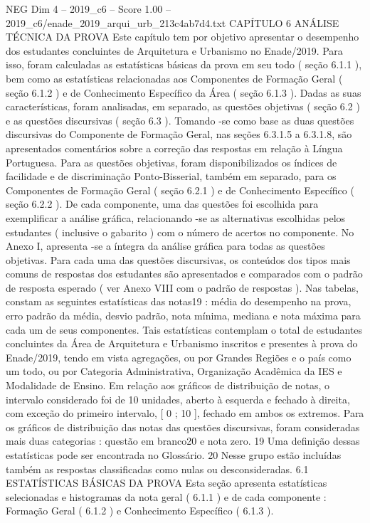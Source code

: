 \begin{textsample}{NEG Dim 4 – 2019\_c6 – Score 1.00 – 2019\_c6/enade\_2019\_arqui\_urb\_213c4ab7d4.txt}  \label{ex:f4_neg_263}
CAPÍTULO 6 ANÁLISE TÉCNICA DA PROVA Este capítulo tem por objetivo apresentar o desempenho dos estudantes concluintes de Arquitetura e Urbanismo no Enade/2019.
Para isso, foram calculadas as estatísticas básicas da prova em seu todo ( seção 6.1.1 ), bem como as estatísticas relacionadas aos Componentes de Formação Geral ( seção 6.1.2 ) e de Conhecimento Específico da Área ( seção 6.1.3 ).
Dadas as suas características, foram analisadas, em separado, as questões objetivas ( seção 6.2 ) e as questões discursivas ( seção 6.3 ).
Tomando -se como base as duas questões discursivas do Componente de Formação Geral, nas seções 6.3.1.5 a 6.3.1.8, são apresentados comentários sobre a correção das respostas em relação à Língua Portuguesa.
Para as questões objetivas, foram disponibilizados os índices de facilidade e de discriminação Ponto-Bisserial, também em separado, para os Componentes de Formação Geral ( seção 6.2.1 ) e de Conhecimento Específico ( seção 6.2.2 ).
De cada componente, uma das questões foi escolhida para exemplificar a análise gráfica, relacionando -se as alternativas escolhidas pelos estudantes ( inclusive o gabarito ) com o número de acertos no componente.
No Anexo I, apresenta -se a íntegra da análise gráfica para todas as questões objetivas.
Para cada uma das questões discursivas, os conteúdos dos tipos mais comuns de respostas dos estudantes são apresentados e comparados com o padrão de resposta esperado ( ver Anexo VIII com o padrão de respostas ).
Nas tabelas, constam as seguintes estatísticas das notas19 : média do desempenho na prova, erro padrão da média, desvio padrão, nota mínima, mediana e nota máxima para cada um de seus componentes.
Tais estatísticas contemplam o total de estudantes concluintes da Área de Arquitetura e Urbanismo inscritos e presentes à prova do Enade/2019, tendo em vista agregações, ou por Grandes Regiões e o país como um todo, ou por Categoria Administrativa, Organização Acadêmica da IES e Modalidade de Ensino.
Em relação aos gráficos de distribuição de notas, o intervalo considerado foi de 10 unidades, aberto à esquerda e fechado à direita, com exceção do primeiro intervalo, [ 0 ; 10 ], fechado em ambos os extremos.
Para os gráficos de distribuição das notas das questões discursivas, foram consideradas mais duas categorias : questão em branco20 e nota zero. 19 Uma definição dessas estatísticas pode ser encontrada no Glossário. 20 Nesse grupo estão incluídas também as respostas classificadas como nulas ou desconsideradas. 6.1 ESTATÍSTICAS BÁSICAS DA PROVA Esta seção apresenta estatísticas selecionadas e histogramas da nota geral ( 6.1.1 ) e de cada componente : Formação Geral ( 6.1.2 ) e Conhecimento Específico ( 6.1.3 ).

\end{textsample}
